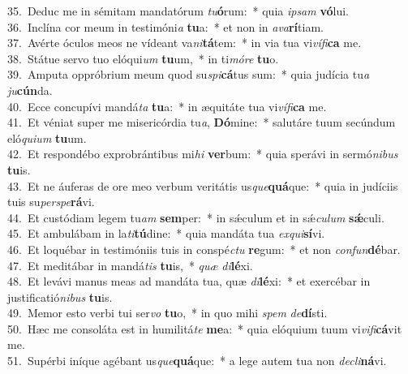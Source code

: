 {35.~}Deduc me in sémitam mandatórum \textit{tu}\textbf{ó}rum:~* quia \textit{i}\textit{psam} \textbf{vó}lui.\\
{36.~}Inclína cor meum in testimóni\textit{a} \textbf{tu}a:~* et non in \textit{a}\textit{va}\textbf{rí}tiam.\\
{37.~}Avérte óculos meos ne vídeant va\textit{ni}\textbf{tá}tem:~* in via tua vi\textit{ví}\textit{fi}\textbf{ca} me.\\
{38.~}Státue servo tuo elóqui\textit{um} \textbf{tu}um,~* in ti\textit{mó}\textit{re} \textbf{tu}o.\\
{39.~}Amputa oppróbrium meum quod su\textit{spi}\textbf{cá}tus sum:~* quia judícia tu\textit{a} \textit{ju}\textbf{cún}da.\\
{40.~}Ecce concupívi mandá\textit{ta} \textbf{tu}a:~* in æquitáte tua vi\textit{ví}\textit{fi}\textbf{ca} me.\\
{41.~}Et véniat super me misericórdia tu\textit{a}, \textbf{Dó}mine:~* salutáre tuum secúndum eló\textit{qui}\textit{um} \textbf{tu}um.\\
{42.~}Et respondébo exprobrántibus mi\textit{hi} \textbf{ver}bum:~* quia sperávi in sermó\textit{ni}\textit{bus} \textbf{tu}is.\\
{43.~}Et ne áuferas de ore meo verbum veritátis us\textit{que}\textbf{quá}que:~* quia in judíciis tuis su\textit{per}\textit{spe}\textbf{rá}vi.\\
{44.~}Et custódiam legem tu\textit{am} \textbf{sem}per:~* in sǽculum et in sǽ\textit{cu}\textit{lum} \textbf{sǽ}culi.\\
{45.~}Et ambulábam in la\textit{ti}\textbf{tú}dine:~* quia mandáta tua \textit{ex}\textit{qui}\textbf{sí}vi.\\
{46.~}Et loquébar in testimóniis tuis in conspé\textit{ctu} \textbf{re}gum:~* et non \textit{con}\textit{fun}\textbf{dé}bar.\\
{47.~}Et meditábar in mandá\textit{tis} \textbf{tu}is,~* \textit{quæ} \textit{di}\textbf{lé}xi.\\
{48.~}Et levávi manus meas ad mandáta tua, quæ \textit{di}\textbf{lé}xi:~* et exercébar in justificatió\textit{ni}\textit{bus} \textbf{tu}is.\\
{49.~}Memor esto verbi tui ser\textit{vo} \textbf{tu}o,~* in quo mihi \textit{spem} \textit{de}\textbf{dí}sti.\\
{50.~}Hæc me consoláta est in humilitá\textit{te} \textbf{me}a:~* quia elóquium tuum vi\textit{vi}\textit{fi}\textbf{cá}vit me.\\
{51.~}Supérbi iníque agébant us\textit{que}\textbf{quá}que:~* a lege autem tua non \textit{de}\textit{cli}\textbf{ná}vi.\\
